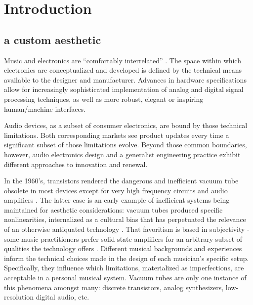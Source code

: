 \chapter{Introduction}\label{introduction}

\section{a custom aesthetic}

Music and electronics are ``comfortably interrelated'' \citep{kettelkamp1984}. The space within which electronics are conceptualized and developed is defined by the technical means available to the designer and manufacturer. Advances in hardware specifications allow for increasingly sophisticated implementation of analog and digital signal processing techniques, as well as more robust, elegant or inspiring human/machine interfaces.  
	
Audio devices, as a subset of consumer electronics, are bound by those technical limitations. Both corresponding markets see product updates every time a significant subset of those limitations evolve. Beyond those common boundaries, however, audio electronics design and a generalist engineering practice exhibit different approaches to innovation and renewal. 

In the 1960's, transistors rendered the dangerous and inefficient vacuum tube obsolete in most devices except for very high frequency circuits and audio amplifiers \citep{barbour1998}. The latter case is an early example of inefficient systems being maintained for aesthetic considerations: vacuum tubes produced specific nonlinearities, internalized as a cultural bias that has perpetuated the relevance of an otherwise antiquated technology \citep{barbour1998}. That favoritism is based in subjectivity - some music practitioners prefer solid state amplifiers for an arbitrary subset of qualities the technology offers \citep{hamm1973}. Different musical backgrounds and experiences inform the technical choices made in the design of each musician's specific setup. Specifically, they influence which limitations, materialized as imperfections, are acceptable in a personal musical system. Vacuum tubes are only one instance of this phenomena amongst many: discrete transistors, analog synthesizers, low-resolution digital audio, etc.  

